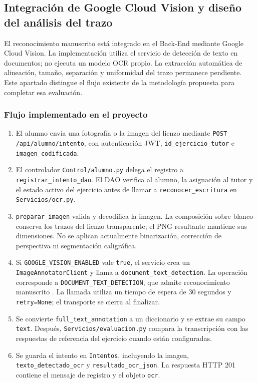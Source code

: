 \subsection{Integración de Google Cloud Vision y diseño del análisis del trazo}
\label{sec:vision-metricas}

El reconocimiento manuscrito está integrado en el Back-End mediante Google Cloud Vision. La implementación utiliza el servicio de detección de texto en documentos; no ejecuta un modelo OCR propio. La extracción automática de alineación, tamaño, separación y uniformidad del trazo permanece pendiente. Este apartado distingue el flujo existente de la metodología propuesta para completar esa evaluación.

\subsubsection{Flujo implementado en el proyecto}
\begin{enumerate}
    \item El alumno envía una fotografía o la imagen del lienzo mediante \texttt{POST /api/alumno/intento}, con autenticación JWT, \texttt{id\_ejercicio\_tutor} e \texttt{imagen\_codificada}.
    \item El controlador \texttt{Control/alumno.py} delega el registro a \texttt{registrar\_intento\_dao}. El DAO verifica al alumno, la asignación al tutor y el estado activo del ejercicio antes de llamar a \texttt{reconocer\_escritura} en \texttt{Servicios/ocr.py}.
    \item \texttt{preparar\_imagen} valida y decodifica la imagen. La composición sobre blanco conserva los trazos del lienzo transparente; el PNG resultante mantiene sus dimensiones. No se aplican actualmente binarización, corrección de perspectiva ni segmentación caligráfica.
    \item Si \texttt{GOOGLE\_VISION\_ENABLED} vale \texttt{true}, el servicio crea un \texttt{ImageAnnotatorClient} y llama a \texttt{document\_text\_detection}. La operación corresponde a \texttt{DOCUMENT\_TEXT\_DETECTION}, que admite reconocimiento manuscrito \cite{googlevisionHandwriting}. La llamada utiliza un tiempo de espera de 30 segundos y \texttt{retry=None}; el transporte se cierra al finalizar.
    \item Se convierte \texttt{full\_text\_annotation} a un diccionario y se extrae su campo \texttt{text}. Después, \texttt{Servicios/evaluacion.py} compara la transcripción con las respuestas de referencia del ejercicio cuando están configuradas.
    \item Se guarda el intento en \texttt{Intentos}, incluyendo la imagen, \texttt{texto\_detectado\_ocr} y \texttt{resultado\_ocr\_json}. La respuesta HTTP 201 contiene el mensaje de registro y el objeto \texttt{ocr}.
\end{enumerate}

